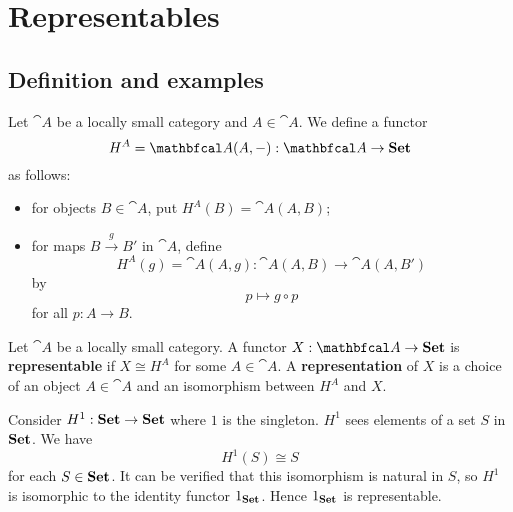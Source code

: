 \section{Representables}
\subsection{Definition and examples}
\begin{definition}
    Let $\cat{A}$ be a locally small category and $A\in\cat{A}$. We define a functor
    \begin{equation*}
        H^A=\cat{A}(A,-): \cat{A}\to\bcat{Set}
    \end{equation*}
    as follows:
    \begin{itemize}
        \item for objects $B\in\cat{A}$, put $H^A(B)=\cat{A}(A,B)$;
        \item for maps $B\xrightarrow{g}B'$ in $\cat{A}$, define
            \begin{equation*}
                H^A(g)=\cat{A}(A,g): \cat{A}(A,B)\to\cat{A}(A,B')
            \end{equation*}
            by
            \begin{equation*}
                p\mapsto g\circ p
            \end{equation*}
            for all $p:A\to B$.
    \end{itemize}
\end{definition}

\begin{definition}
    Let $\cat{A}$ be a locally small category. A functor $X:\cat{A}\to\bcat{Set}$ is \textbf{representable} if $X\cong H^A$ for some $A\in\cat{A}$. A \textbf{representation} of $X$ is a choice of an object $A\in\cat{A}$ and an isomorphism between $H^A$ and $X$.
\end{definition}

\begin{example}
    Consider $H^1:\mathbf{Set}\to\mathbf{Set}$ where $1$ is the singleton. $H^1$ sees elements of a set $S$ in $\mathbf{Set}$. We have
    \begin{equation*}
        H^1(S)\cong S
    \end{equation*}
    for each $S\in\mathbf{Set}$. It can be verified that this isomorphism is natural in $S$, so $H^1$ is isomorphic to the identity functor $1_{\mathbf{Set}}$. Hence $1_{\mathbf{Set}}$ is representable.
\end{example}

